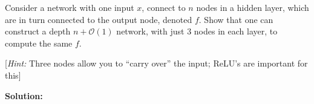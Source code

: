 \documentclass[12pt]{article}
\newcommand{\BigO}[1]{\mathcal{O}\left( #1 \right)}
\begin{document}
\begin{enumerate}
Consider a network with one input $x$, connect to $n$ nodes in a hidden layer, which are in turn connected to the output node, denoted $f$. Show that one can construct a depth $n + \BigO{1}$ network, with just 3 nodes in each layer, to compute the same $f$.

[{\em Hint:} Three nodes allow you to ``carry over'' the input; ReLU's are important for this]

   {\bf Solution:}
\end{enumerate}
 
\end{document}
